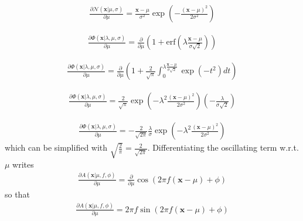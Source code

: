 \documentclass{article}
\begin{document}
\begin{align}
\frac{\partial \mathcal{N}(\mathbf{x}|\mu,\sigma)}{\partial \mu} = \frac{\mathbf{x}-\mu}{\sigma^2} \exp\left(-\frac{\left(\mathbf{x}-\mu\right)^2}{2\sigma^2}\right)
\end{align}

\begin{align}
\frac{\partial\Phi(\mathbf{x} |\lambda,\mu,\sigma)}{\partial\mu}=\frac{\partial}{\partial\mu} \left(1 + \text{erf}\left(\lambda\frac{\mathbf{x}-\mu}{\sigma\sqrt{2}}\right)\right)
\end{align}

\begin{align}
\frac{\partial\Phi(\mathbf{x}|\lambda,\mu,\sigma)}{\partial\mu}=\frac{\partial}{\partial\mu}\left(1 + \frac{2}{\sqrt{\pi}}\int_{0}^{\lambda\frac{\mathbf{x}-\mu}{\sigma\sqrt{2}}}\exp\left(-t^2\right)dt\right)
\end{align}

\begin{align}
\frac{\partial\Phi(\mathbf{x}|\lambda,\mu,\sigma)}{\partial\mu}= \frac{2}{\sqrt{\pi}}\exp\left(-\lambda^2\frac{(\mathbf{x}-\mu)^2}{2\sigma^2}\right)\left(-\frac{\lambda}{\sigma\sqrt{2}}\right)
\end{align}

\begin{align}
\frac{\partial\Phi(\mathbf{x}|\lambda,\mu,\sigma)}{\partial\mu}=-\frac{2}{\sqrt{2\pi}}\frac{\lambda}{\sigma}\exp\left(-\lambda^2\frac{(\mathbf{x}-\mu)^2}{2\sigma^2}\right)
\end{align}
which can be simplified with $\sqrt{\frac{2}{\pi}}=\frac{2}{\sqrt{2\pi}}$. Differentiating the oscillating term w.r.t. $\mu$ writes
\begin{align}
\frac{\partial A(\mathbf{x}|\mu,f,\phi)}{\partial \mu} = \frac{\partial}{\partial\mu} \cos\left(2 \pi f \left(\mathbf{x} - \mu\right) + \phi\right)
\end{align}
so that
\begin{align}
\frac{\partial A(\mathbf{x}|\mu,f,\phi)}{\partial \mu} = 2\pi f \sin\left(2\pi f(\mathbf{x}-\mu)+\phi\right)
\end{align}
%
\end{document}
